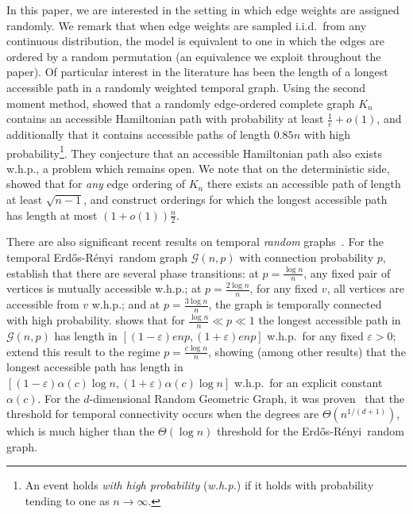 \documentclass[11pt]{article}
\theoremstyle{definition}
\theoremstyle{remark}
\theoremstyle{remark}
\numberwithin{theorem}{section}
\newcommand{\Gnp}{\mathcal{G}(n,p)}
\newcommand{\ER}{Erd\H{o}s-R\'e{}nyi}
\begin{document}
In this paper, we are interested in the setting in which edge weights are assigned randomly. We remark that when edge weights are sampled i.i.d.\ from any continuous distribution, the model is equivalent to one in which the edges are ordered by a random permutation (an equivalence we exploit throughout the paper). Of particular interest in the literature has been the length of a longest accessible path in a randomly weighted temporal graph. Using the second moment method, \cite{lavrov2016increasing} showed that a randomly edge-ordered complete graph $K_{n}$ contains an accessible Hamiltonian path with probability at least $\frac{1}{e} + o(1)$, and additionally that it contains accessible paths of length $0.85n$ with high probability\footnote{An event holds \emph{with high probability} (\emph{w.h.p.}) if it holds with probability tending to one as $n \to \infty$.}. They conjecture that an accessible Hamiltonian path also exists w.h.p., a problem which remains open. We note that on the deterministic side, \cite{graham1973increasing} showed that for \textit{any} edge ordering of $K_{n}$ there exists an accessible path of length at least $\sqrt{n-1}$, and \cite{calderbank1984increasing} construct orderings for which the longest accessible path has length at most $(1+o(1))\frac{n}{2}$.

There are also significant recent results on temporal \emph{random} graphs~\citep{angel2020long,becker2022giant,broutin2023increasing,casteigts2024sharp}. For the temporal \ER~random graph $\Gnp$ with connection probability $p$, \cite{casteigts2024sharp} establish that there are several phase transitions: at $p= \frac {\log n}{n}$, any fixed pair of vertices is mutually accessible w.h.p.; at $p= \frac {2\log n}{n}$, for any fixed $v$, all vertices are accessible from $v$ w.h.p.; and at $p=\frac {3\log n}{n}$, the graph is temporally connected with high probability. \cite{angel2020long} shows that for $\frac{\log n}{n} \ll p \ll 1$ the longest accessible path in $\Gnp$ has length in $[(1-\varepsilon)enp, (1+\varepsilon)enp]$ w.h.p.\ for any fixed $\varepsilon >0$; \cite{broutin2023increasing} extend this result to the regime $p = \frac{c\log n}{n}$, showing (among other results) that the longest accessible path has length in $[(1-\varepsilon)\alpha(c)\log n, (1+\varepsilon)\alpha(c)\log n]$ w.h.p.\ for an explicit constant $\alpha(c)$. For the $d$-dimensional Random Geometric Graph, it was proven~\citep{Brandenberger_Donderwinkel_Kerriou_Lugosi_Mitchell_2025} that the threshold for temporal connectivity occurs when the degrees are $\Theta(n^{1/(d+1)})$, which is much higher than the $\Theta(\log n)$ threshold for the \ER~random graph.
\end{document}
